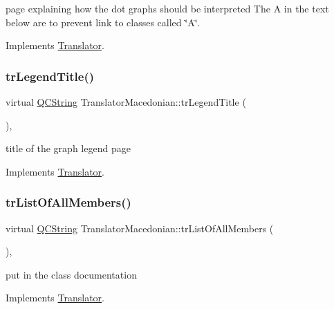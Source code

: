 page explaining how the dot graph\textquotesingle{}s should be interpreted The A in the text below are to prevent link to classes called \char`\"{}\+A\char`\"{}. 

Implements \mbox{\hyperlink{class_translator}{Translator}}.

\mbox{\label{class_translator_macedonian_a0d5f66ce3fe7572e4c6a422e4023ffef}} 
\subsubsection{\texorpdfstring{trLegendTitle()}{trLegendTitle()}}
{\footnotesize\ttfamily virtual \mbox{\hyperlink{class_q_c_string}{Q\+C\+String}} Translator\+Macedonian\+::tr\+Legend\+Title (\begin{DoxyParamCaption}{ }\end{DoxyParamCaption})\hspace{0.3cm}{\ttfamily [inline]}, {\ttfamily [virtual]}}

title of the graph legend page 

Implements \mbox{\hyperlink{class_translator}{Translator}}.

\mbox{\label{class_translator_macedonian_a8c9440b42990c82bc12fce14ac46b03b}} 
\subsubsection{\texorpdfstring{trListOfAllMembers()}{trListOfAllMembers()}}
{\footnotesize\ttfamily virtual \mbox{\hyperlink{class_q_c_string}{Q\+C\+String}} Translator\+Macedonian\+::tr\+List\+Of\+All\+Members (\begin{DoxyParamCaption}{ }\end{DoxyParamCaption})\hspace{0.3cm}{\ttfamily [inline]}, {\ttfamily [virtual]}}

put in the class documentation 

Implements \mbox{\hyperlink{class_translator}{Translator}}.

\mbox{\label{class_translator_macedonian_aa5842af3444d48d46b85d1a49412d79e}} 
